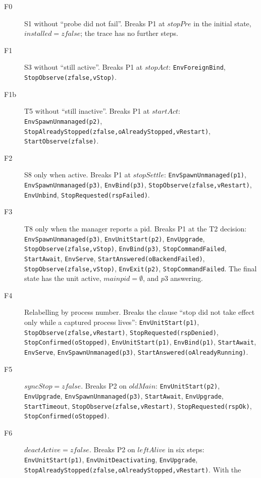 \documentclass[a4paper,10pt,fleqn]{article}
\begin{document}
\begin{description}
  \item[F0] S1 without ``probe did not fail''. Breaks P1 at $stopPre$ in the
    initial state, $installed = zfalse$; the trace has no further steps.
  \item[F1] S3 without ``still active''. Breaks P1 at $stopAct$:
    \texttt{EnvForeignBind}, \texttt{StopObserve(zfalse,vStop)}.
  \item[F1b] T5 without ``still inactive''. Breaks P1 at $startAct$:
    \texttt{EnvSpawnUnmanaged(p2)},
    \texttt{StopAlreadyStopped(zfalse,oAlreadyStopped,vRestart)},
    \texttt{StartObserve(zfalse)}.
  \item[F2] S8 only when active. Breaks P1 at $stopSettle$:
    \texttt{EnvSpawnUnmanaged(p1)}, \texttt{EnvSpawnUnmanaged(p3)},
    \texttt{EnvBind(p3)}, \texttt{StopObserve(zfalse,vRestart)},
    \texttt{EnvUnbind}, \texttt{StopRequested(rspFailed)}.
  \item[F3] T8 only when the manager reports a pid. Breaks P1 at the T2
    decision: \texttt{EnvSpawnUnmanaged(p3)}, \texttt{EnvUnitStart(p2)},
    \texttt{EnvUpgrade}, \texttt{StopObserve(zfalse,vStop)},
    \texttt{EnvBind(p3)}, \texttt{StopCommandFailed}, \texttt{StartAwait},
    \texttt{EnvServe}, \texttt{StartAnswered(oBackendFailed)},
    \texttt{StopObserve(zfalse,vStop)}, \texttt{EnvExit(p2)},
    \texttt{StopCommandFailed}. The final state has the unit active,
    $mainpid = \emptyset$, and $p3$ answering.
  \item[F4] Relabelling by process number. Breaks the clause ``stop did not
    take effect only while a captured process lives'':
    \texttt{EnvUnitStart(p1)}, \texttt{StopObserve(zfalse,vRestart)},
    \texttt{StopRequested(rspDenied)}, \texttt{StopConfirmed(oStopped)},
    \texttt{EnvUnitStart(p1)}, \texttt{EnvBind(p1)}, \texttt{StartAwait},
    \texttt{EnvServe}, \texttt{EnvSpawnUnmanaged(p3)},
    \texttt{StartAnswered(oAlreadyRunning)}.
  \item[F5] $syncStop = zfalse$. Breaks P2 on $oldMain$:
    \texttt{EnvUnitStart(p2)}, \texttt{EnvUpgrade},
    \texttt{EnvSpawnUnmanaged(p3)}, \texttt{StartAwait},
    \texttt{EnvUpgrade}, \texttt{StartTimeout},
    \texttt{StopObserve(zfalse,vRestart)}, \texttt{StopRequested(rspOk)},
    \texttt{StopConfirmed(oStopped)}.
  \item[F6] $deactActive = zfalse$. Breaks P2 on $leftAlive$ in six steps:
    \texttt{EnvUnitStart(p1)}, \texttt{EnvUnitDeactivating},
    \texttt{EnvUpgrade},
    \texttt{StopAlreadyStopped(zfalse,oAlreadyStopped,vRestart)}. With the

\end{description}
\end{document}

